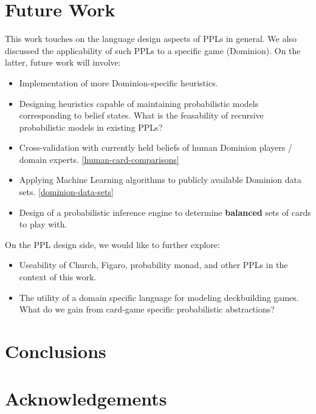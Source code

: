 
\section{Future Work} \label{sec:future}

This work touches on the language design aspects of PPLs
in general. We also discussed the applicability of such PPLs
to a specific game (Dominion). On the latter, future work
will involve:

\begin{itemize}
\item Implementation of more Dominion-specific heuristics.
\item Designing heuristics capable of maintaining probabilistic models
      corresponding to belief states. What is the feasability of recursive
      probabilistic models in existing PPLs?
\item Cross-validation with currently held beliefs of human Dominion
      players / domain experts. \ref{human-card-comparisons}
\item Applying Machine Learning algorithms to publicly available Dominion
      data sets. \ref{dominion-data-sets}
\item Design of a probabilistic inference engine to determine
      {\bf balanced} sets of cards to play with.
\end{itemize}

On the PPL design side, we would like to further explore:

\begin{itemize}
\item Useability of Church, Figaro, probability monad, and other
      PPLs in the context of this work.
\item The utility of a domain specific language for modeling deckbuilding
      games. What do we gain from card-game specific probabilistic
      abstractions?
\end{itemize}

\section{Conclusions} \label{sec:conc}

\section{Acknowledgements} \label{sec:ack}

